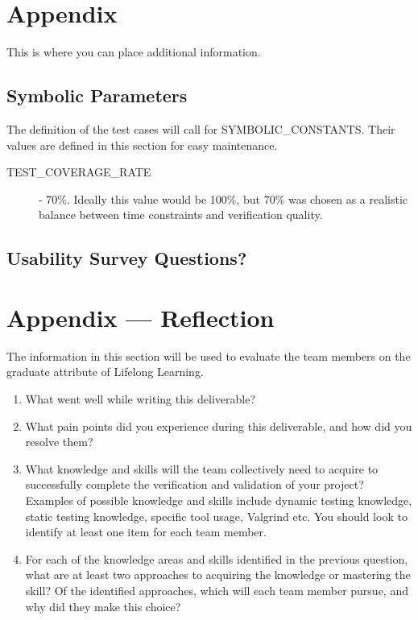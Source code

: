 \documentclass[12pt, titlepage]{article}
\begin{document}
\section{Appendix}

This is where you can place additional information.

\subsection{Symbolic Parameters}

The definition of the test cases will call for SYMBOLIC\_CONSTANTS.
Their values are defined in this section for easy maintenance.\\

\begin{description}
  \item[TEST\_COVERAGE\_RATE] - 70\%. Ideally this value would be 100\%, but 70\% was chosen as a realistic balance between time constraints and verification quality.
\end{description}

\subsection{Usability Survey Questions?}


\newpage{}
\section*{Appendix --- Reflection}


The information in this section will be used to evaluate the team members on the
graduate attribute of Lifelong Learning.



\begin{enumerate}
  \item What went well while writing this deliverable?
  \item What pain points did you experience during this deliverable, and how
    did you resolve them?
  \item What knowledge and skills will the team collectively need to acquire to
  successfully complete the verification and validation of your project?
  Examples of possible knowledge and skills include dynamic testing knowledge,
  static testing knowledge, specific tool usage, Valgrind etc.  You should look to
  identify at least one item for each team member.
  \item For each of the knowledge areas and skills identified in the previous
  question, what are at least two approaches to acquiring the knowledge or
  mastering the skill?  Of the identified approaches, which will each team
  member pursue, and why did they make this choice?
\end{enumerate}
\end{document}
